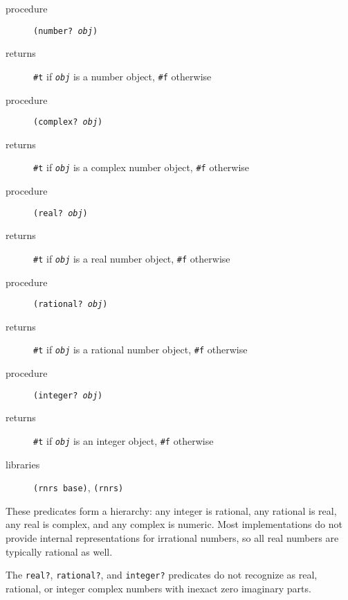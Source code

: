 \begin{description}

\label{objects_s17}\item[procedure] \texttt{(number? \textit{obj})}



\item[returns] \texttt{\#{}t} if \texttt{\textit{obj}} is a number object, \texttt{\#{}f} otherwise


\item[procedure] \texttt{(complex? \textit{obj})}



\item[returns] \texttt{\#{}t} if \texttt{\textit{obj}} is a complex number object, \texttt{\#{}f} otherwise


\item[procedure] \texttt{(real? \textit{obj})}



\item[returns] \texttt{\#{}t} if \texttt{\textit{obj}} is a real number object, \texttt{\#{}f} otherwise


\item[procedure] \texttt{(rational? \textit{obj})}



\item[returns] \texttt{\#{}t} if \texttt{\textit{obj}} is a rational number object, \texttt{\#{}f} otherwise


\item[procedure] \texttt{(integer? \textit{obj})}



\item[returns] \texttt{\#{}t} if \texttt{\textit{obj}} is an integer object, \texttt{\#{}f} otherwise


\item[libraries] \texttt{(rnrs base)}, \texttt{(rnrs)}
\end{description}


These predicates form a hierarchy: any integer is rational, any
rational is real, any real is complex, and any complex is numeric.
Most implementations do not provide internal representations for
irrational numbers, so all real numbers are typically rational
as well.


The \texttt{real?}, \texttt{rational?}, and \texttt{integer?} predicates do
not recognize as real, rational, or integer complex numbers with inexact
zero imaginary parts.


